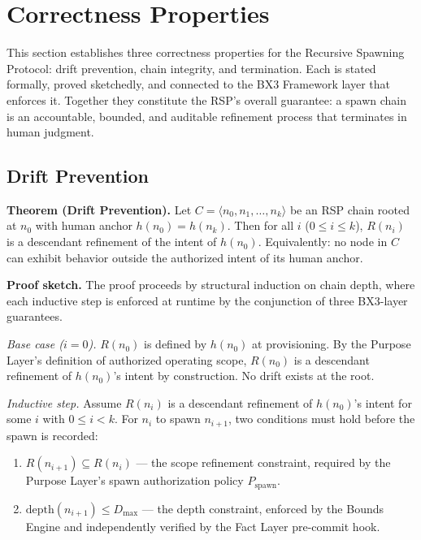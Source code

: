 \section{Correctness Properties}
\label{sec:rs-correctness}

This section establishes three correctness properties for the Recursive Spawning Protocol: drift prevention, chain integrity, and termination. Each is stated formally, proved sketchedly, and connected to the BX3 Framework layer that enforces it. Together they constitute the RSP's overall guarantee: a spawn chain is an accountable, bounded, and auditable refinement process that terminates in human judgment.

\subsection{Drift Prevention}
\label{sec:rs-drift-prevention}

\medskip
\noindent\textbf{Theorem (Drift Prevention).} Let $C = \langle n_0, n_1, \ldots, n_k \rangle$ be an RSP chain rooted at $n_0$ with human anchor $h(n_0) = h(n_k)$. Then for all $i$ ($0 \leq i \leq k$), $R(n_i)$ is a descendant refinement of the intent of $h(n_0)$. Equivalently: no node in $C$ can exhibit behavior outside the authorized intent of its human anchor.

\medskip
\noindent\textbf{Proof sketch.} The proof proceeds by structural induction on chain depth, where each inductive step is enforced at runtime by the conjunction of three BX3-layer guarantees.

\medskip
\textit{Base case ($i=0$).} $R(n_0)$ is defined by $h(n_0)$ at provisioning. By the Purpose Layer's definition of authorized operating scope, $R(n_0)$ is a descendant refinement of $h(n_0)$'s intent by construction. No drift exists at the root.

\medskip
\textit{Inductive step.} Assume $R(n_i)$ is a descendant refinement of $h(n_0)$'s intent for some $i$ with $0 \leq i < k$. For $n_i$ to spawn $n_{i+1}$, two conditions must hold before the spawn is recorded:

\begin{enumerate}
  \item[(a)] $R(n_{i+1}) \subseteq R(n_i)$ --- the scope refinement constraint, required by the Purpose Layer's spawn authorization policy $P_{\mathrm{spawn}}$.
  \item[(b)] $\mathrm{depth}(n_{i+1}) \leq D_{\mathrm{max}}$ --- the depth constraint, enforced by the Bounds Engine and independently verified by the Fact Layer pre-commit hook.
\end{enumerate}

